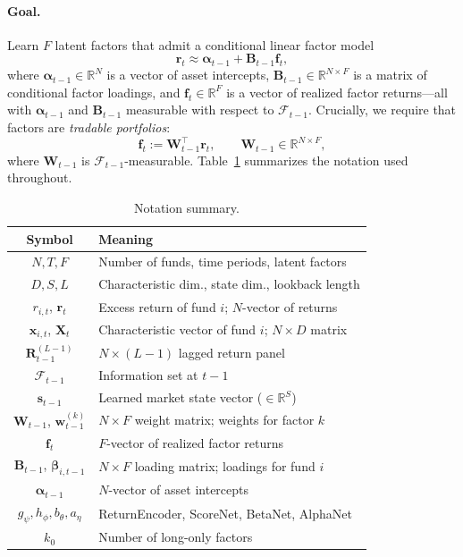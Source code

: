 \paragraph{Goal.} Learn $F$ latent factors that admit a conditional linear factor model
\begin{equation}\label{eq:factor-model}
    \mathbf{r}_t \approx \boldsymbol{\alpha}_{t-1} + \mathbf{B}_{t-1} \mathbf{f}_t,
\end{equation}
where $\boldsymbol{\alpha}_{t-1} \in \mathbb{R}^N$ is a vector of asset intercepts, $\mathbf{B}_{t-1} \in \mathbb{R}^{N \times F}$ is a matrix of conditional factor loadings, and $\mathbf{f}_t \in \mathbb{R}^F$ is a vector of realized factor returns---all with $\boldsymbol{\alpha}_{t-1}$ and $\mathbf{B}_{t-1}$ measurable with respect to $\mathcal{F}_{t-1}$. Crucially, we require that factors are \emph{tradable portfolios}:
\begin{equation}\label{eq:tradable}
    \mathbf{f}_t := \mathbf{W}_{t-1}^\top \mathbf{r}_t, \qquad \mathbf{W}_{t-1} \in \mathbb{R}^{N \times F},
\end{equation}
where $\mathbf{W}_{t-1}$ is $\mathcal{F}_{t-1}$-measurable. Table~\ref{tab:notation} summarizes the notation used throughout.

\begin{table}[t]
\centering
\caption{Notation summary.}
\label{tab:notation}
\small
\begin{tabular}{cl}
\toprule
\textbf{Symbol} & \textbf{Meaning} \\
\midrule
$N, T, F$ & Number of funds, time periods, latent factors \\
$D, S, L$ & Characteristic dim., state dim., lookback length \\
$r_{i,t}$, $\mathbf{r}_t$ & Excess return of fund $i$; $N$-vector of returns \\
$\mathbf{x}_{i,t}$, $\mathbf{X}_t$ & Characteristic vector of fund $i$; $N \times D$ matrix \\
$\mathbf{R}_{t-1}^{(L-1)}$ & $N \times (L-1)$ lagged return panel \\
$\mathcal{F}_{t-1}$ & Information set at $t-1$ \\
$\mathbf{s}_{t-1}$ & Learned market state vector ($\in \mathbb{R}^S$) \\
$\mathbf{W}_{t-1}$, $\mathbf{w}_{t-1}^{(k)}$ & $N \times F$ weight matrix; weights for factor $k$ \\
$\mathbf{f}_t$ & $F$-vector of realized factor returns \\
$\mathbf{B}_{t-1}$, $\boldsymbol{\beta}_{i,t-1}$ & $N \times F$ loading matrix; loadings for fund $i$ \\
$\boldsymbol{\alpha}_{t-1}$ & $N$-vector of asset intercepts \\
$g_\psi, h_\phi, b_\theta, a_\eta$ & ReturnEncoder, ScoreNet, BetaNet, AlphaNet \\
$k_0$ & Number of long-only factors \\
\bottomrule
\end{tabular}
\end{table}


